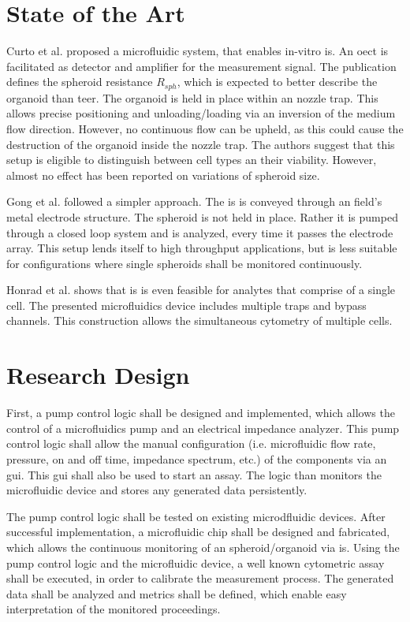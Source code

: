 \documentclass{article}
\begin{document}
\section{State of the Art}
\label{sec:state_of_the_art}
Curto et al. \cite{Curto2018} proposed a microfluidic system, that enables in-vitro \gls{is}. An \gls{oect} is facilitated as detector and amplifier for the measurement signal. The publication defines the spheroid resistance $R_{sph}$, which is expected to better describe the organoid than \gls{teer}. The organoid is held in place within an nozzle trap. This allows precise positioning and unloading/loading via an inversion of the medium flow direction. However, no continuous flow can be upheld, as this could cause the destruction of the organoid inside the nozzle trap. The authors suggest that this setup is eligible to distinguish between cell types an their viability. However, almost no effect has been reported on variations of spheroid size. 

Gong et al. \cite{Gong2021} followed a simpler approach. The \gls{is} is conveyed through an field's metal electrode structure. The spheroid is not held in place. Rather it is pumped through a closed loop system and is analyzed, every time it passes the electrode array. This setup lends itself to high throughput applications, but is less suitable for configurations where single spheroids shall be monitored continuously.

Honrad et al. \cite{Honrado2021} shows that \gls{is} is even feasible for analytes that comprise of a single cell. The presented microfluidics device includes multiple traps and bypass channels. This construction allows the simultaneous cytometry of multiple cells. 

\section{Research Design}
\label{sec:research_design}
First, a pump control logic shall be designed and implemented, which allows the control of a microfluidics pump and an electrical impedance analyzer. This pump control logic shall allow the manual configuration (i.e. microfluidic flow rate, pressure, on and off time, impedance spectrum, etc.) of the components via an \gls{gui}. This \gls{gui} shall also be used to start an assay. The logic than monitors the microfluidic device and stores any generated data persistently.

The pump control logic shall be tested on existing microdfluidic devices. After successful implementation, a microfluidic chip shall be designed and fabricated, which allows the continuous monitoring of an spheroid/organoid via \gls{is}. Using the pump control logic and the microfluidic device, a well known cytometric assay shall be executed, in order to calibrate the measurement process. The generated data shall be analyzed and metrics shall be defined, which enable easy interpretation of the monitored proceedings. 
\end{document}
